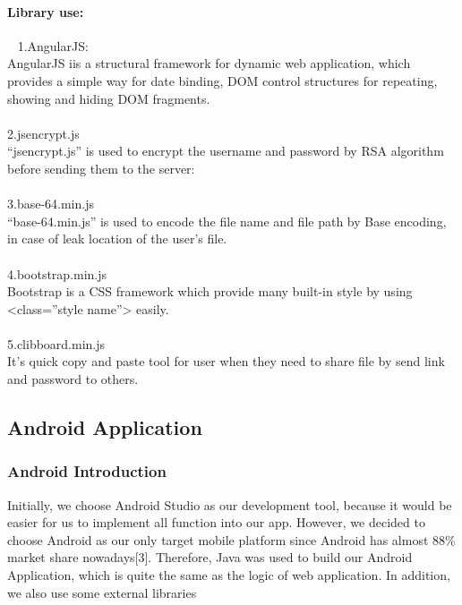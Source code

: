 \documentclass[12pt,a4]{article}
\begin{document}
\paragraph{Library use:}~{}
\newline
1.AngularJS:\\
AngularJS iis a structural framework for dynamic web application, which provides a simple way for date binding, DOM control structures for repeating, showing and hiding DOM fragments.\\\\
2.jsencrypt.js\\
“jsencrypt.js” is used to encrypt the username and password by RSA algorithm before sending them to the server:\\\\
3.base-64.min.js\\
“base-64.min.js” is used to encode the file name and file path by Base encoding, in case of leak location of the user’s file.\\\\
4.bootstrap.min.js\\
Bootstrap is a CSS framework which provide many built-in style by using <class=”style name”> easily.\\\\
5.clibboard.min.js\\
It’s quick copy and paste tool for user when they need to share file by send link and password to others.

\subsection{Android Application}\label{4.4}


\subsubsection{Android Introduction}\label{4.3.1}
Initially, we choose Android Studio as our development tool, because it would be easier for us to implement all function into our app. However, we decided to choose Android as our only target mobile platform since Android has almost 88\% market share nowadays[3]. Therefore, Java was used to build our Android Application, which is quite  the same as the logic of web application. In addition, we also use some external libraries
\end{document}

